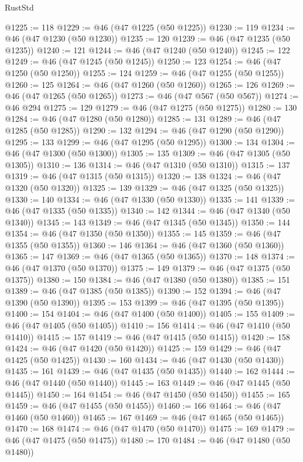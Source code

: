 \begin{lexlean}{RustStd}
\begin{coremodule}
@1225 := 118
@1229 := @46 (@47 @1225 (@50 @1225))
@1230 := 119
@1234 := @46 (@47 @1230 (@50 @1230))
@1235 := 120
@1239 := @46 (@47 @1235 (@50 @1235))
@1240 := 121
@1244 := @46 (@47 @1240 (@50 @1240))
@1245 := 122
@1249 := @46 (@47 @1245 (@50 @1245))
@1250 := 123
@1254 := @46 (@47 @1250 (@50 @1250))
@1255 := 124
@1259 := @46 (@47 @1255 (@50 @1255))
@1260 := 125
@1264 := @46 (@47 @1260 (@50 @1260))
@1265 := 126
@1269 := @46 (@47 @1265 (@50 @1265))
@1273 := @46 (@47 @567 (@50 @567))
@1274 := @46 @294
@1275 := 129
@1279 := @46 (@47 @1275 (@50 @1275))
@1280 := 130
@1284 := @46 (@47 @1280 (@50 @1280))
@1285 := 131
@1289 := @46 (@47 @1285 (@50 @1285))
@1290 := 132
@1294 := @46 (@47 @1290 (@50 @1290))
@1295 := 133
@1299 := @46 (@47 @1295 (@50 @1295))
@1300 := 134
@1304 := @46 (@47 @1300 (@50 @1300))
@1305 := 135
@1309 := @46 (@47 @1305 (@50 @1305))
@1310 := 136
@1314 := @46 (@47 @1310 (@50 @1310))
@1315 := 137
@1319 := @46 (@47 @1315 (@50 @1315))
@1320 := 138
@1324 := @46 (@47 @1320 (@50 @1320))
@1325 := 139
@1329 := @46 (@47 @1325 (@50 @1325))
@1330 := 140
@1334 := @46 (@47 @1330 (@50 @1330))
@1335 := 141
@1339 := @46 (@47 @1335 (@50 @1335))
@1340 := 142
@1344 := @46 (@47 @1340 (@50 @1340))
@1345 := 143
@1349 := @46 (@47 @1345 (@50 @1345))
@1350 := 144
@1354 := @46 (@47 @1350 (@50 @1350))
@1355 := 145
@1359 := @46 (@47 @1355 (@50 @1355))
@1360 := 146
@1364 := @46 (@47 @1360 (@50 @1360))
@1365 := 147
@1369 := @46 (@47 @1365 (@50 @1365))
@1370 := 148
@1374 := @46 (@47 @1370 (@50 @1370))
@1375 := 149
@1379 := @46 (@47 @1375 (@50 @1375))
@1380 := 150
@1384 := @46 (@47 @1380 (@50 @1380))
@1385 := 151
@1389 := @46 (@47 @1385 (@50 @1385))
@1390 := 152
@1394 := @46 (@47 @1390 (@50 @1390))
@1395 := 153
@1399 := @46 (@47 @1395 (@50 @1395))
@1400 := 154
@1404 := @46 (@47 @1400 (@50 @1400))
@1405 := 155
@1409 := @46 (@47 @1405 (@50 @1405))
@1410 := 156
@1414 := @46 (@47 @1410 (@50 @1410))
@1415 := 157
@1419 := @46 (@47 @1415 (@50 @1415))
@1420 := 158
@1424 := @46 (@47 @1420 (@50 @1420))
@1425 := 159
@1429 := @46 (@47 @1425 (@50 @1425))
@1430 := 160
@1434 := @46 (@47 @1430 (@50 @1430))
@1435 := 161
@1439 := @46 (@47 @1435 (@50 @1435))
@1440 := 162
@1444 := @46 (@47 @1440 (@50 @1440))
@1445 := 163
@1449 := @46 (@47 @1445 (@50 @1445))
@1450 := 164
@1454 := @46 (@47 @1450 (@50 @1450))
@1455 := 165
@1459 := @46 (@47 @1455 (@50 @1455))
@1460 := 166
@1464 := @46 (@47 @1460 (@50 @1460))
@1465 := 167
@1469 := @46 (@47 @1465 (@50 @1465))
@1470 := 168
@1474 := @46 (@47 @1470 (@50 @1470))
@1475 := 169
@1479 := @46 (@47 @1475 (@50 @1475))
@1480 := 170
@1484 := @46 (@47 @1480 (@50 @1480))

\end{coremodule}
\end{lexlean}
